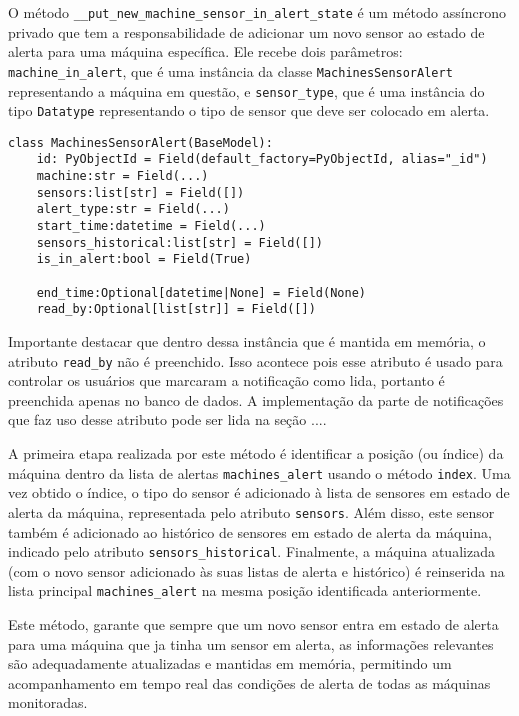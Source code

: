 O método \texttt{\_\_put\_new\_machine\_sensor\_in\_alert\_state} é um método assíncrono privado que tem a responsabilidade de adicionar um novo sensor ao estado de alerta para uma máquina específica. Ele recebe dois parâmetros: \texttt{machine\_in\_alert}, que é uma instância da classe \texttt{MachinesSensorAlert} representando a máquina em questão, e \texttt{sensor\_type}, que é uma instância do tipo \texttt{Datatype} representando o tipo de sensor que deve ser colocado em alerta.

\begin{verbatim}
class MachinesSensorAlert(BaseModel):
    id: PyObjectId = Field(default_factory=PyObjectId, alias="_id")
    machine:str = Field(...)
    sensors:list[str] = Field([])
    alert_type:str = Field(...)
    start_time:datetime = Field(...)
    sensors_historical:list[str] = Field([])
    is_in_alert:bool = Field(True)
    
    end_time:Optional[datetime|None] = Field(None)
    read_by:Optional[list[str]] = Field([])
\end{verbatim}

Importante destacar que dentro dessa instância que é mantida em memória, o atributo \texttt{read\_by} não é preenchido. Isso acontece pois esse atributo é usado para controlar os usuários que marcaram a notificação como lida, portanto é preenchida apenas no banco de dados. A implementação da parte de notificações que faz uso desse atributo pode ser lida na seção ....%


A primeira etapa realizada por este método é identificar a posição (ou índice) da máquina dentro da lista de alertas \texttt{machines\_alert} usando o método \texttt{index}. Uma vez obtido o índice, o tipo do sensor é adicionado à lista de sensores em estado de alerta da máquina, representada pelo atributo \texttt{sensors}. Além disso, este sensor também é adicionado ao histórico de sensores em estado de alerta da máquina, indicado pelo atributo \texttt{sensors\_historical}. Finalmente, a máquina atualizada (com o novo sensor adicionado às suas listas de alerta e histórico) é reinserida na lista principal \texttt{machines\_alert} na mesma posição identificada anteriormente.

Este método, garante que sempre que um novo sensor entra em estado de alerta para uma máquina que ja tinha um sensor em alerta, as informações relevantes são adequadamente atualizadas e mantidas em memória, permitindo um acompanhamento em tempo real das condições de alerta de todas as máquinas monitoradas.

